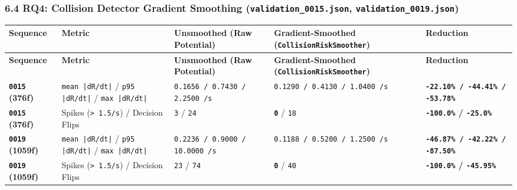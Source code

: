 \documentclass[10.5pt,a4paper]{article}
\begin{document}
\subsubsection{6.4 RQ4: Collision Detector Gradient Smoothing (\texttt{validation\_\allowbreak{}0015.\allowbreak{}json}, \texttt{validation\_\allowbreak{}0019.\allowbreak{}json})}

\begin{footnotesize}
\setlength{\tabcolsep}{4pt}
\setlength{\LTleft}{0pt}\setlength{\LTright}{0pt}
\begin{longtable}{>{\raggedright\arraybackslash}p{} >{\raggedright\arraybackslash}p{} >{\raggedright\arraybackslash}p{} >{\raggedright\arraybackslash}p{} >{\raggedright\arraybackslash}p{}}
\toprule
\textbf{Sequence} & \textbf{Metric} & \textbf{Unsmoothed (Raw Potential)} & \textbf{Gradient-Smoothed (\texttt{CollisionRiskSmoother})} & \textbf{Reduction} \\
\midrule
\endfirsthead
\toprule
\textbf{Sequence} & \textbf{Metric} & \textbf{Unsmoothed (Raw Potential)} & \textbf{Gradient-Smoothed (\texttt{CollisionRiskSmoother})} & \textbf{Reduction} \\
\midrule
\endhead
\bottomrule
\endfoot
\textbf{\texttt{0015} (376f)} & \texttt{mean |dR/\allowbreak{}dt|} / \texttt{p95 |dR/\allowbreak{}dt|} / \texttt{max |dR/\allowbreak{}dt|} & \texttt{0.\allowbreak{}1656 /\allowbreak{} 0.\allowbreak{}7430 /\allowbreak{} 2.\allowbreak{}2500 /\allowbreak{}s} & \texttt{0.\allowbreak{}1290 /\allowbreak{} 0.\allowbreak{}4130 /\allowbreak{} 1.\allowbreak{}0400 /\allowbreak{}s} & \textbf{\texttt{-\allowbreak{}22.\allowbreak{}10\% /\allowbreak{} -\allowbreak{}44.\allowbreak{}41\% /\allowbreak{} -\allowbreak{}53.\allowbreak{}78\%}} \\
\textbf{\texttt{0015} (376f)} & Spikes (\texttt{> 1.\allowbreak{}5/\allowbreak{}s}) / Decision Flips & \texttt{3} / \texttt{24} & \textbf{\texttt{0}} / \texttt{18} & \textbf{\texttt{-\allowbreak{}100.\allowbreak{}0\%} / \texttt{-\allowbreak{}25.\allowbreak{}0\%}} \\
\textbf{\texttt{0019} (1059f)} & \texttt{mean |dR/\allowbreak{}dt|} / \texttt{p95 |dR/\allowbreak{}dt|} / \texttt{max |dR/\allowbreak{}dt|} & \texttt{0.\allowbreak{}2236 /\allowbreak{} 0.\allowbreak{}9000 /\allowbreak{} 10.\allowbreak{}0000 /\allowbreak{}s} & \texttt{0.\allowbreak{}1188 /\allowbreak{} 0.\allowbreak{}5200 /\allowbreak{} 1.\allowbreak{}2500 /\allowbreak{}s} & \textbf{\texttt{-\allowbreak{}46.\allowbreak{}87\% /\allowbreak{} -\allowbreak{}42.\allowbreak{}22\% /\allowbreak{} -\allowbreak{}87.\allowbreak{}50\%}} \\
\textbf{\texttt{0019} (1059f)} & Spikes (\texttt{> 1.\allowbreak{}5/\allowbreak{}s}) / Decision Flips & \texttt{23} / \texttt{74} & \textbf{\texttt{0}} / \texttt{40} & \textbf{\texttt{-\allowbreak{}100.\allowbreak{}0\%} / \texttt{-\allowbreak{}45.\allowbreak{}95\%}} \\
\end{longtable}
\end{footnotesize}
\end{document}
